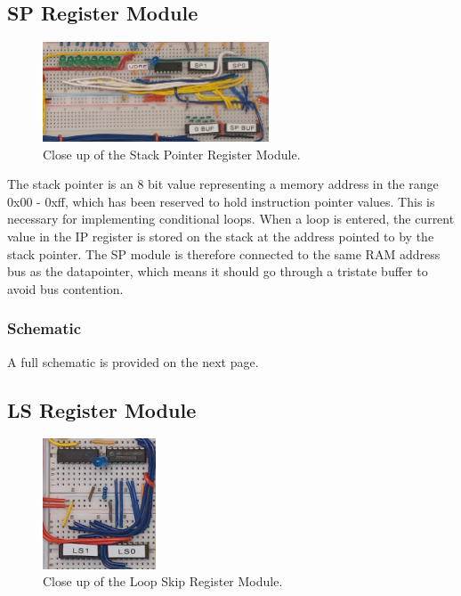 
\subsection{SP Register Module}
\begin{figure}[H]
  \centering
  \includegraphics[width=0.6\textwidth]{img/spregistercloseup}
  \caption{Close up of the Stack Pointer Register Module.}
  \label{fig:spregcloseup}
\end{figure}

The stack pointer is an 8 bit value representing a memory address in the range 0x00 - 0xff, which has been reserved to hold instruction pointer values. This is necessary for implementing conditional loops. When a loop is entered, the current value in the IP register is stored on the stack at the address pointed to by the stack pointer. The SP module is therefore connected to the same RAM address bus as the datapointer, which means it should go through a tristate buffer to avoid bus contention.


\subsubsection{Schematic}
A full schematic is provided on the next page.




\subsection{LS Register Module}
\begin{figure}[H]
  \centering
  \includegraphics[width=0.3\textwidth]{img/lsregistercloseup}
  \caption{Close up of the Loop Skip Register Module.}
  \label{fig:spregcloseup}
\end{figure}

